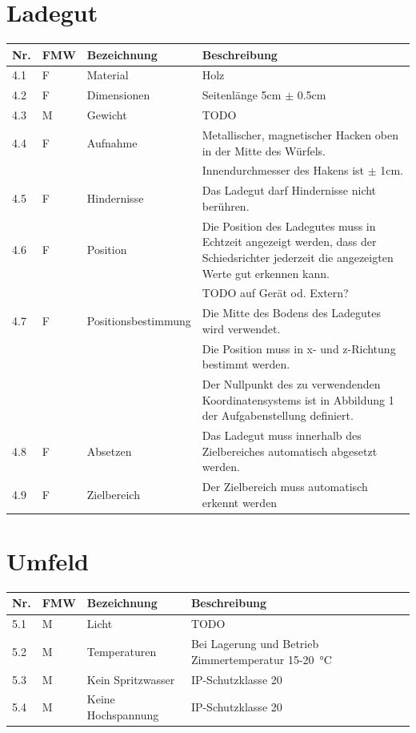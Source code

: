 \documentclass[a4paper]{report}
\begin{document}
\section{Ladegut}
\begin{tabular}{|p{}|p{}|p{}|p{}|}
	\hline
	\textbf{Nr.} & \textbf{FMW\footnotemark} & \textbf{Bezeichnung} & \textbf{Beschreibung} \\
	\hline
	4.1 & F & Material & Holz \\
	\hline
	4.2 & F &  Dimensionen & Seitenlänge 5cm $\pm$ 0.5cm \\
	\hline
	4.3 & M & Gewicht & TODO \\
	\hline
	4.4 & F & Aufnahme & Metallischer, magnetischer Hacken oben in der Mitte des Würfels.\\
	& & & Innendurchmesser des Hakens ist $\pm$ 1cm. \\
	\hline
	4.5 & F & Hindernisse & Das Ladegut darf Hindernisse nicht berühren. \\
	\hline
	4.6 & F & Position & Die Position des Ladegutes muss in Echtzeit angezeigt werden, dass der Schiedsrichter jederzeit die angezeigten Werte gut erkennen kann.\\
	& & & TODO auf Gerät od. Extern? \\
	\hline
	4.7 & F & Positionsbestimmung & Die Mitte des Bodens des Ladegutes wird verwendet.\\
	& & & Die Position muss in x- und z-Richtung bestimmt werden.\\
	& & & Der Nullpunkt des zu verwendenden Koordinatensystems ist in Abbildung 1 der Aufgabenstellung definiert. \\
	\hline
	4.8 & F & Absetzen & Das Ladegut muss innerhalb des Zielbereiches automatisch abgesetzt werden. \\
	\hline
	4.9 & F & Zielbereich & Der Zielbereich muss automatisch erkennt werden\\
	\hline
\end{tabular}

\section{Umfeld}
\begin{tabular}{|p{}|p{}|p{}|p{}|}
	\hline
	\textbf{Nr.} & \textbf{FMW\footnotemark} & \textbf{Bezeichnung} & \textbf{Beschreibung} \\
	\hline
	5.1 & M & Licht & TODO \\
	\hline
	5.2 & M & Temperaturen & Bei Lagerung und Betrieb Zimmertemperatur 15-\SI{20}{\degreeCelsius}\\
	\hline
	5.3 & M & Kein Spritzwasser & IP-Schutzklasse 20\\
	\hline
	5.4 & M & Keine Hochspannung & IP-Schutzklasse 20\\
	\hline
\end{tabular}
\end{document}
